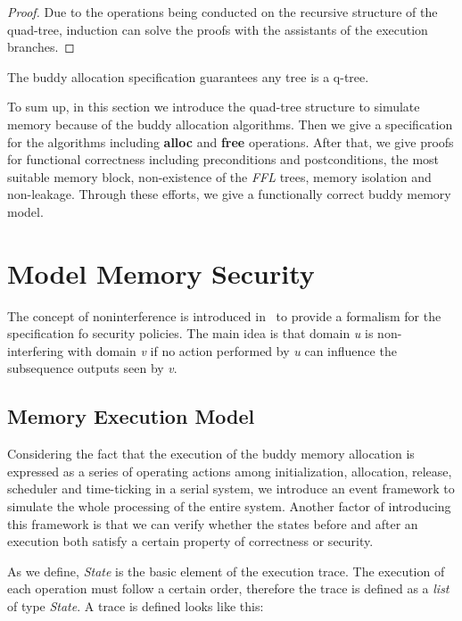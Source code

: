 \documentclass[runningheads]{llncs}
\begin{document}
\begin{proof}
Due to the operations being conducted on the recursive structure of the quad-tree, induction can solve the proofs with the assistants of the execution branches.
\end{proof}

\begin{theorem}
The buddy allocation specification guarantees any tree is a q-tree.
\end{theorem}

To sum up, in this section we introduce the quad-tree structure to simulate memory because of the buddy allocation algorithms. Then we give a specification for the algorithms including \textbf{alloc} and \textbf{free} operations. After that, we give proofs for functional correctness including preconditions and postconditions, the most suitable memory block, non-existence of the \textsl{FFL} trees, memory isolation and non-leakage. Through these efforts, we give a functionally correct buddy memory model.


\section{Model Memory Security}
The concept of noninterference is introduced in~\cite{reg_noninterference} to provide a formalism for the specification fo security policies. The main idea is that domain \textsl{u} is non-interfering with domain \textsl{v} if no action performed by \textsl{u} can influence the subsequence outputs seen by \textsl{v}.

\subsection{Memory Execution Model}
Considering the fact that the execution of the buddy memory allocation is expressed as a series of operating actions among initialization, allocation, release, scheduler and time-ticking in a serial system, we introduce an event framework to simulate the whole processing of the entire system. Another factor of introducing this framework is that we can verify whether the states before and after an execution both satisfy a certain property of correctness or security.

As we define, \textsl{State} is the basic element of the execution trace. The execution of each operation must follow a certain order, therefore the trace is defined as a \textsl{list} of type \textsl{State}. A trace is defined looks like this:
\end{document}
